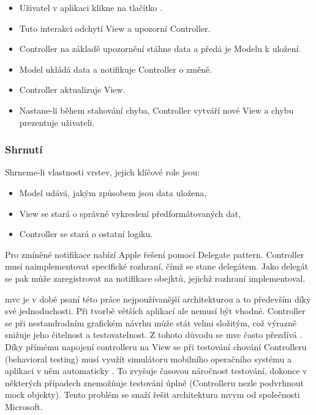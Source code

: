 \begin{itemize}
  \item Uživatel v aplikaci klikne na tlačítko .
  \item Tuto interakci odchytí View a upozorní Controller.
  \item Controller na základě upozornění stáhne data a předá je Modelu k uložení.
  \item Model ukládá data a notifikuje Controller o změně.
  \item Controller aktualizuje View.
  \item Nastane-li během stahování chyba, Controller vytváří nové View a chybu prezentuje uživateli.
\end{itemize}


\subsubsection*{Shrnutí}

Shrneme-li vlastnosti vrstev, jejich klíčové role jsou:

\begin{itemize}
  \item Model udává, jakým způsobem jsou data uložena,
  \item View se stará o správné vykreslení předformátovaných dat,
  \item Controller se stará o ostatní logiku.
\end{itemize}


Pro zmíněné notifikace nabízí Apple řešení pomocí Delegate pattern.
Controller musí naimplementovat specifické rozhraní, čímž se stane delegátem.
Jako delegát se pak může zaregistrovat na notifikace obejktů, jejichž rozhraní implementoval.

\acrshort{mvc} je v době psaní této práce nejpoužívanější architekturou a to především díky své jednoduchosti.
Při tvorbě větších aplikací ale nemusí být vhodné.
Controller se při nestandradním grafickém návrhu může stát velmi složitým, což výrazně snižuje jeho čitelnost a testovatelnost.
Z tohoto důvodu se \acrshort{mvc} často přezdívá .
Díky přímému napojení controlleru na View se při testování chování Controlleru (behavioral testing) musí využít simulátoru mobilního operačního systému a aplikaci v něm automaticky .
To zvyšuje časovou náročnost testování, dokonce v některých případech znemožňuje testování úplně (Controlleru nezle podvrhnout mock objekty).
Tento problém se snaží řešit architektura \acrshort{mvvm} od společnosti Microsoft.

